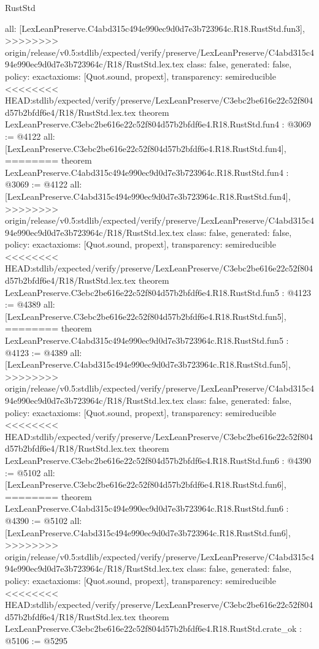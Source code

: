 \begin{lexlean}{RustStd}
\begin{coremodule}
{\begin{coremodule}
{{{{{{{  all: [LexLeanPreserve.C4abd315c494e990ec9d0d7e3b723964c.R18.RustStd.fun3],
>>>>>>>> origin/release/v0.5:stdlib/expected/verify/preserve/LexLeanPreserve/C4abd315c494e990ec9d0d7e3b723964c/R18/RustStd.lex.tex
  class: false,
  generated: false,
  policy: exact{axioms: [Quot.sound, propext]},
  transparency: semireducible
}
<<<<<<<< HEAD:stdlib/expected/verify/preserve/LexLeanPreserve/C3ebc2be616e22c52f804d57b2bfdf6e4/R18/RustStd.lex.tex
theorem LexLeanPreserve.C3ebc2be616e22c52f804d57b2bfdf6e4.R18.RustStd.fun4 : @3069 := @4122 {
  all: [LexLeanPreserve.C3ebc2be616e22c52f804d57b2bfdf6e4.R18.RustStd.fun4],
========
theorem LexLeanPreserve.C4abd315c494e990ec9d0d7e3b723964c.R18.RustStd.fun4 : @3069 := @4122 {
  all: [LexLeanPreserve.C4abd315c494e990ec9d0d7e3b723964c.R18.RustStd.fun4],
>>>>>>>> origin/release/v0.5:stdlib/expected/verify/preserve/LexLeanPreserve/C4abd315c494e990ec9d0d7e3b723964c/R18/RustStd.lex.tex
  class: false,
  generated: false,
  policy: exact{axioms: [Quot.sound, propext]},
  transparency: semireducible
}
<<<<<<<< HEAD:stdlib/expected/verify/preserve/LexLeanPreserve/C3ebc2be616e22c52f804d57b2bfdf6e4/R18/RustStd.lex.tex
theorem LexLeanPreserve.C3ebc2be616e22c52f804d57b2bfdf6e4.R18.RustStd.fun5 : @4123 := @4389 {
  all: [LexLeanPreserve.C3ebc2be616e22c52f804d57b2bfdf6e4.R18.RustStd.fun5],
========
theorem LexLeanPreserve.C4abd315c494e990ec9d0d7e3b723964c.R18.RustStd.fun5 : @4123 := @4389 {
  all: [LexLeanPreserve.C4abd315c494e990ec9d0d7e3b723964c.R18.RustStd.fun5],
>>>>>>>> origin/release/v0.5:stdlib/expected/verify/preserve/LexLeanPreserve/C4abd315c494e990ec9d0d7e3b723964c/R18/RustStd.lex.tex
  class: false,
  generated: false,
  policy: exact{axioms: [Quot.sound, propext]},
  transparency: semireducible
}
<<<<<<<< HEAD:stdlib/expected/verify/preserve/LexLeanPreserve/C3ebc2be616e22c52f804d57b2bfdf6e4/R18/RustStd.lex.tex
theorem LexLeanPreserve.C3ebc2be616e22c52f804d57b2bfdf6e4.R18.RustStd.fun6 : @4390 := @5102 {
  all: [LexLeanPreserve.C3ebc2be616e22c52f804d57b2bfdf6e4.R18.RustStd.fun6],
========
theorem LexLeanPreserve.C4abd315c494e990ec9d0d7e3b723964c.R18.RustStd.fun6 : @4390 := @5102 {
  all: [LexLeanPreserve.C4abd315c494e990ec9d0d7e3b723964c.R18.RustStd.fun6],
>>>>>>>> origin/release/v0.5:stdlib/expected/verify/preserve/LexLeanPreserve/C4abd315c494e990ec9d0d7e3b723964c/R18/RustStd.lex.tex
  class: false,
  generated: false,
  policy: exact{axioms: [Quot.sound, propext]},
  transparency: semireducible
}
<<<<<<<< HEAD:stdlib/expected/verify/preserve/LexLeanPreserve/C3ebc2be616e22c52f804d57b2bfdf6e4/R18/RustStd.lex.tex
theorem LexLeanPreserve.C3ebc2be616e22c52f804d57b2bfdf6e4.R18.RustStd.crate_ok : @5106 := @5295 {
}}}}}}}}}}
\end{coremodule}}
\end{coremodule}
\end{lexlean}
